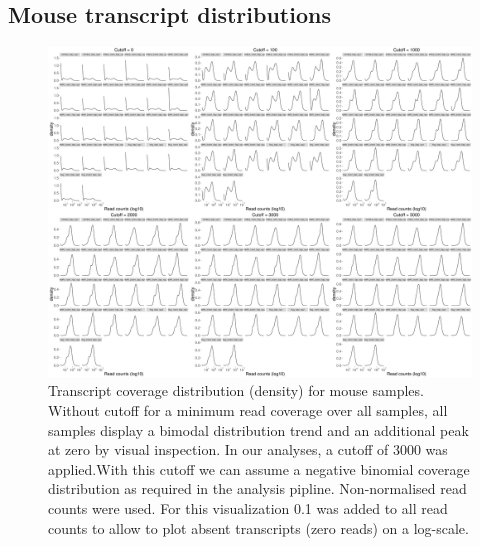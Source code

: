 \documentclass{article}
\begin{document}
\subsection{Mouse transcript distributions}
\begin{figure}[H]
\centering
\includegraphics[width=\textwidth]{distributionsMm.pdf}
	\caption{Transcript coverage distribution (density) for mouse samples. 
 Without cutoff for a minimum read coverage over all samples, all samples display a bimodal distribution trend and an additional peak at zero by visual inspection. In our analyses, a cutoff of 3000 was applied.With this cutoff we can assume a negative binomial coverage distribution as required in the analysis pipline. Non-normalised read counts were used. For this visualization 0.1 was added to all read counts to allow to plot absent transcripts (zero reads) on a log-scale.}
\end{figure}

\clearpage
\end{document}
